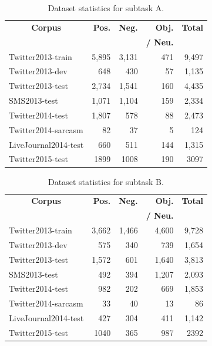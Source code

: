 \documentclass[11pt]{article}
\begin{document}
\begin{table}[t]
\small
\begin{center}
\begin{tabular}{p{2.7cm} r r  r r}
\hline
\multicolumn{1}{c}{\bf Corpus} & \bf Pos. & \bf Neg. & \bf Obj. & \bf Total \\
&  &  & \bf / Neu. &\\
\hline
Twitter2013-train  & 5,895 & 3,131 &  471 & 9,497\\
Twitter2013-dev  & 648 & 430 &  57 &  1,135 \\
Twitter2013-test  & 2,734 & 1,541 & 160 & 4,435\\
SMS2013-test  & 1,071 & 1,104 & 159 & 2,334\\
Twitter2014-test  & 1,807 & 578 & 88 & 2,473\\
\footnotesize{Twitter2014-sarcasm} & 82 & 37 & 5 & 124\\
\footnotesize{LiveJournal2014-test}  & 660 & 511 & 144 & 1,315\\
Twitter2015-test & 1899 & 1008 & 190 & 3097 \\
\hline
\end{tabular}
\caption{Dataset statistics for subtask A.}
\label{T:CorpusStatsA}
\end{center}
\end{table}

\begin{table}[t]
\small
\begin{center}
\begin{tabular}{p{2.7cm} r r  r r}
\hline
\multicolumn{1}{c}{\bf Corpus} & \bf Pos. & \bf Neg. & \bf Obj. & \bf Total\\
&  &  & \bf / Neu. &\\
\hline
Twitter2013-train & 3,662 & 1,466 &  4,600 & 9,728\\
Twitter2013-dev & 575 & 340 &  739 & 1,654\\
Twitter2013-test  & 1,572 & 601 & 1,640 & 3,813\\
SMS2013-test  & 492 & 394 & 1,207 & 2,093\\
Twitter2014-test  & 982 & 202 & 669 & 1,853\\
\footnotesize{Twitter2014-sarcasm} & 33 & 40 & 13 & 86\\
\footnotesize{LiveJournal2014-test}  & 427 & 304 & 411 & 1,142\\
Twitter2015-test & 1040 & 365 & 987 & 2392 \\
\hline
\end{tabular}
\caption{Dataset statistics for subtask B.}
\label{T:CorpusStatsB}
\end{center}
\end{table}
\end{document}
